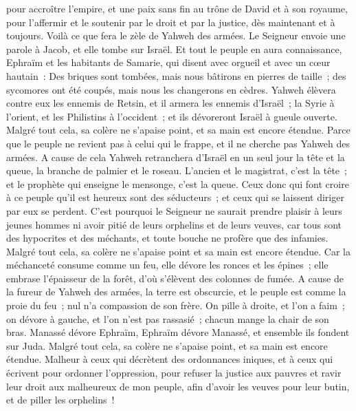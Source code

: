 \begin{multicols}{2}
pour accroître l'empire, et une paix sans fin au trône de David et à son royaume, pour l'affermir et le soutenir par le droit et par la justice, dès maintenant et à toujours. Voilà ce que fera le zèle de Yahweh des armées.
Le Seigneur envoie une parole à Jacob, et elle tombe sur Israël.
Et tout le peuple en aura connaissance, Ephraïm et les habitants de Samarie, qui disent avec orgueil et avec un cœur hautain~:
Des briques sont tombées, mais nous bâtirons en pierres de taille~; des sycomores ont été coupés, mais nous les changerons en cèdres.
Yahweh élèvera contre eux les ennemis de Retsin, et il armera les ennemis d'Israël~;
la Syrie à l'orient, et les Philistins à l'occident~; et ils dévoreront Israël à gueule ouverte. Malgré tout cela, sa colère ne s'apaise point, et sa main est encore étendue.
Parce que le peuple ne revient pas à celui qui le frappe, et il ne cherche pas Yahweh des armées.
A cause de cela Yahweh retranchera d'Israël en un seul jour la tête et la queue, la branche de palmier et le roseau.
L'ancien et le magistrat, c'est la tête~; et le prophète qui enseigne le mensonge, c'est la queue.
Ceux donc qui font croire à ce peuple qu'il est heureux sont des séducteurs~; et ceux qui se laissent diriger par eux se perdent.
C'est pourquoi le Seigneur ne saurait prendre plaisir à leurs jeunes hommes ni avoir pitié de leurs orphelins et de leurs veuves, car tous sont des hypocrites et des méchants, et toute bouche ne profère que des infamies. Malgré tout cela, sa colère ne s'apaise point et sa main est encore étendue.
Car la méchanceté consume comme un feu, elle dévore les ronces et les épines~; elle embrase l'épaisseur de la forêt, d'où s'élèvent des colonnes de fumée.
A cause de la fureur de Yahweh des armées, la terre est obscurcie, et le peuple est comme la proie du feu~; nul n'a compassion de son frère.
On pille à droite, et l'on a faim~; on dévore à gauche, et l'on n'est pas rassasié~; chacun mange la chair de son bras.
Manassé dévore Ephraïm, Ephraïm dévore Manassé, et ensemble ils fondent sur Juda. Malgré tout cela, sa colère ne s'apaise point, et sa main est encore étendue.
\VerseOne{}Malheur à ceux qui décrètent des ordonnances iniques, et à ceux qui écrivent pour ordonner l'oppression,
pour refuser la justice aux pauvres et ravir leur droit aux malheureux de mon peuple, afin d'avoir les veuves pour leur butin, et de piller les orphelins~!

\end{multicols}
